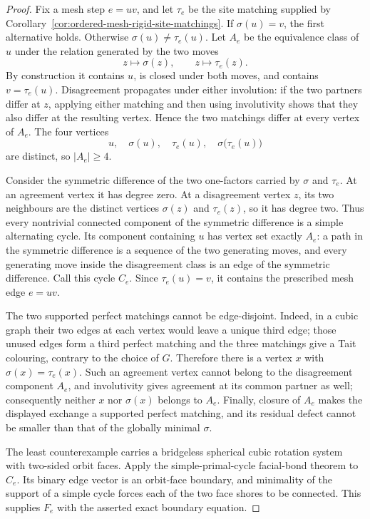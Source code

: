 \begin{proof}
Fix a mesh step \(e=uv\), and let \(\tau_e\) be the site matching supplied by
Corollary~\ref{cor:ordered-mesh-rigid-site-matchings}.  If
\(\sigma(u)=v\), the first alternative holds.  Otherwise
\(\sigma(u)\ne\tau_e(u)\).  Let \(A_e\) be the equivalence class of \(u\)
under the relation generated by the two moves
\[
                  z\longmapsto\sigma(z),
             \qquad z\longmapsto\tau_e(z).
\]
By construction it contains \(u\), is closed under both moves, and contains
\(v=\tau_e(u)\).  Disagreement propagates under either involution: if the two
partners differ at \(z\), applying either matching and then using
involutivity shows that they also differ at the resulting vertex.  Hence the
two matchings differ at every vertex of \(A_e\).  The four vertices
\[
 u,\quad \sigma(u),\quad \tau_e(u),\quad
 \sigma\bigl(\tau_e(u)\bigr)
\]
are distinct, so \(|A_e|\geq4\).

Consider the symmetric difference of the two one-factors carried by
\(\sigma\) and \(\tau_e\).  At an agreement vertex it has degree zero.  At a
disagreement vertex \(z\), its two neighbours are the distinct vertices
\(\sigma(z)\) and \(\tau_e(z)\), so it has degree two.  Thus every nontrivial
connected component of the symmetric difference is a simple alternating
cycle.  Its component containing \(u\) has vertex set exactly \(A_e\): a
path in the symmetric difference is a sequence of the two generating moves,
and every generating move inside the disagreement class is an edge of the
symmetric difference.  Call this cycle \(C_e\).  Since
\(\tau_e(u)=v\), it contains the prescribed mesh edge \(e=uv\).

The two supported perfect matchings cannot be edge-disjoint.  Indeed, in a
cubic graph their two edges at each vertex would leave a unique third edge;
those unused edges form a third perfect matching and the three matchings give
a Tait colouring, contrary to the choice of \(G\).  Therefore there is a
vertex \(x\) with \(\sigma(x)=\tau_e(x)\).  Such an agreement vertex cannot
belong to the disagreement component \(A_e\), and involutivity gives agreement
at its common partner as well; consequently neither \(x\) nor \(\sigma(x)\)
belongs to \(A_e\).  Finally, closure of \(A_e\) makes the displayed exchange
a supported perfect matching, and its residual defect cannot be smaller than
that of the globally minimal \(\sigma\).

The least counterexample carries a bridgeless spherical cubic rotation system
with two-sided orbit faces.  Apply the simple-primal-cycle facial-bond theorem
to \(C_e\).  Its binary edge vector is an orbit-face boundary, and minimality
of the support of a simple cycle forces each of the two face shores to be
connected.  This supplies \(F_e\) with the asserted exact boundary equation.


\end{proof}
